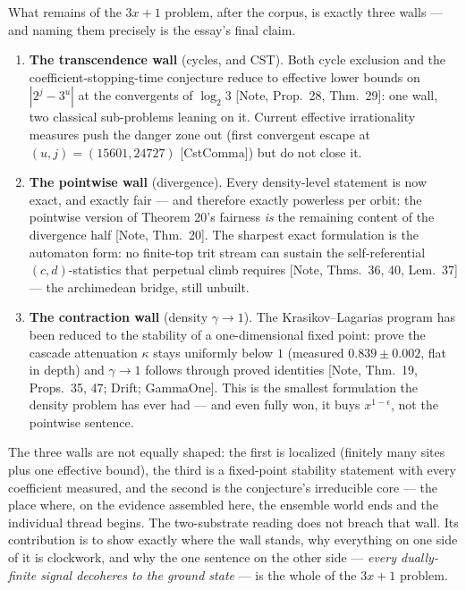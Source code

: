\documentclass[11pt]{article}
\theoremstyle{definition}
\theoremstyle{remark}
\newcommand{\anchor}[1]{\textup{[#1]}}
\begin{document}
What remains of the $3x+1$ problem, after the corpus, is exactly three
walls --- and naming them precisely is the essay's final claim.

\begin{enumerate}[leftmargin=2em]
\item \textbf{The transcendence wall} (cycles, and CST). Both cycle exclusion
and the coefficient-stopping-time conjecture reduce to effective lower bounds
on $|2^j - 3^u|$ at the convergents of $\log_2 3$ \anchor{Note, Prop.~28,
Thm.~29}: one wall, two classical sub-problems leaning on it. Current
effective irrationality measures \cite{Baker1966, Rhin1987} push the danger
zone out (first convergent escape at $(u,j) = (15601, 24727)$
\anchor{CstComma}) but do not close it.
\item \textbf{The pointwise wall} (divergence). Every density-level statement
is now exact, and exactly fair --- and therefore exactly powerless per orbit:
the pointwise version of Theorem 20's fairness \emph{is} the remaining
content of the divergence half \anchor{Note, Thm.~20}. The sharpest exact
formulation is the automaton form: no finite-top trit stream can sustain the
self-referential $(c,d)$-statistics that perpetual climb requires
\anchor{Note, Thms.~36, 40, Lem.~37} --- the archimedean bridge, still
unbuilt.
\item \textbf{The contraction wall} (density $\gamma \to 1$). The
Krasikov--Lagarias program has been reduced to the stability of a
one-dimensional fixed point: prove the cascade attenuation $\kappa$ stays
uniformly below $1$ (measured $0.839 \pm 0.002$, flat in depth) and
$\gamma \to 1$ follows through proved identities \anchor{Note, Thm.~19,
Props.~35, 47; Drift; GammaOne}. This is the smallest formulation the
density problem has ever had --- and even fully won, it buys $x^{1-\epsilon}$,
not the pointwise sentence.
\end{enumerate}

The three walls are not equally shaped: the first is localized (finitely many
sites plus one effective bound), the third is a fixed-point stability
statement with every coefficient measured, and the second is the conjecture's
irreducible core --- the place where, on the evidence assembled here, the
ensemble world ends and the individual thread begins. The two-substrate
reading does not breach that wall. Its contribution is to show exactly where
the wall stands, why everything on one side of it is clockwork, and why the
one sentence on the other side --- \emph{every dually-finite signal decoheres
to the ground state} --- is the whole of the $3x+1$ problem.
\end{document}
